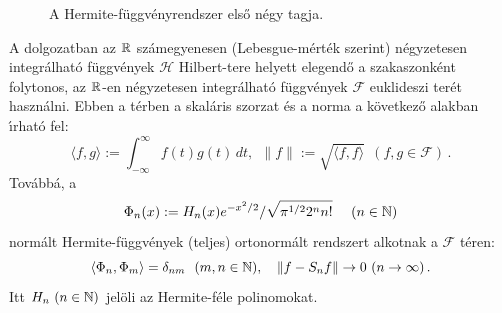 \documentclass[oneside,titlepage,12pt,a4paper]{report}
\begin{document}
\begin{figure}
\caption{A Hermite-f\"uggv\'enyrendszer első négy tagja.}
\label{fig:phi0-3}
\end{figure}

A dolgozatban  az $\Bbb R$ sz\'amegyenesen (Lebesgue-mérték szerint) n\'egyzetesen integr\'alhat\'o f\"uggv\'enyek $\mathcal H$ Hilbert-tere helyett elegend\H o a szakaszonk\'ent folytonos, az $\Bbb R$-en  n\'egyzetesen integr\'alhat\'o f\"uggv\'enyek $\mathcal F$ euklideszi ter\'et haszn\'alni. Ebben a t\'erben a skal\'aris szorzat \'es a norma a következő alakban \'\i rhat\'o fel:
\begin{equation}
 \langle f,g\rangle:=\int_{-\infty}^\infty f(t)g(t)\, dt,\ \ \|f\|:=\sqrt{\langle f,f\rangle}\ \ (f,g\in\mathcal F)\,.
\label{eq:dotprod}
\end{equation}
Továbbá, a
 \begin{equation*}
 \Phi_n(x):=H_n(x)e^{-x^2/2}/\sqrt{\pi^{1/2}2^n n!}\quad \ (n\in\Bbb N)
 \end{equation*}
norm\'alt Hermite-f\"uggv\'enyek (teljes) ortonorm\'alt rendszert alkotnak a $\mathcal F$ t\'eren:
  \begin{equation*}
   \langle \Phi_n,\Phi_m\rangle=\delta_{nm}\ \ (m,n\in\Bbb N),\quad
  \|f-S_nf\|\to 0\ (n\to\infty)\,.
   \end{equation*}
Itt $H_n\ (n\in\Bbb N)$ jel\"oli az Hermite-f\'ele polinomokat.
\end{document}
